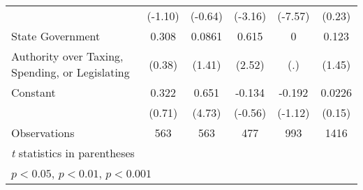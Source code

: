 {\begin{tabular}{l*{5}{c}}
                    &     (-1.10)         &     (-0.64)         &     (-3.16)         &     (-7.57)         &      (0.23)         \\
[1em]
State Government    &       0.308         &      0.0861         &       0.615\sym{*}  &           0         &       0.123         \\
Authority over Taxing, Spending, or Legislating&      (0.38)         &      (1.41)         &      (2.52)         &         (.)         &      (1.45)         \\
[1em]
Constant            &       0.322         &       0.651\sym{***}&      -0.134         &      -0.192         &      0.0226         \\
                    &      (0.71)         &      (4.73)         &     (-0.56)         &     (-1.12)         &      (0.15)         \\
\hline
Observations        &         563         &         563         &         477         &         993         &        1416         \\
\hline\hline
\multicolumn{6}{l}{\footnotesize \textit{t} statistics in parentheses}\\
\multicolumn{6}{l}{\footnotesize \sym{*} \(p<0.05\), \sym{**} \(p<0.01\), \sym{***} \(p<0.001\)}\\
\end{tabular}
}
